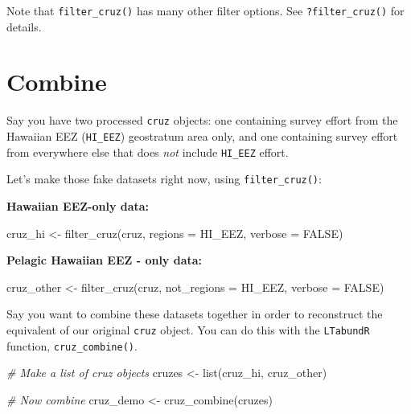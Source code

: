 \documentclass[
]{book}
\newenvironment{Shaded}{\begin{snugshade}}{\end{snugshade}}
\newcommand{\AttributeTok}[1]{\textcolor[rgb]{0.77,0.63,0.00}{#1}}
\newcommand{\CommentTok}[1]{\textcolor[rgb]{0.56,0.35,0.01}{\textit{#1}}}
\newcommand{\ConstantTok}[1]{\textcolor[rgb]{0.00,0.00,0.00}{#1}}
\newcommand{\FunctionTok}[1]{\textcolor[rgb]{0.00,0.00,0.00}{#1}}
\newcommand{\NormalTok}[1]{#1}
\newcommand{\OtherTok}[1]{\textcolor[rgb]{0.56,0.35,0.01}{#1}}
\newcommand{\StringTok}[1]{\textcolor[rgb]{0.31,0.60,0.02}{#1}}
\begin{document}
Note that \texttt{filter\_cruz()} has many other filter options. See \texttt{?filter\_cruz()} for details.

\hypertarget{combine}{%
\section*{Combine}\label{combine}}

Say you have two processed \texttt{cruz} objects: one containing survey effort from the Hawaiian EEZ (\texttt{HI\_EEZ}) geostratum area only, and one containing survey effort from everywhere else that does \emph{not} include \texttt{HI\_EEZ} effort.

Let's make those fake datasets right now, using \texttt{filter\_cruz()}:

\textbf{Hawaiian EEZ-only data:}

\begin{Shaded}
\begin{Highlighting}[]
\NormalTok{cruz\_hi }\OtherTok{\textless{}{-}} \FunctionTok{filter\_cruz}\NormalTok{(cruz, }
                            \AttributeTok{regions =} \StringTok{\textquotesingle{}HI\_EEZ\textquotesingle{}}\NormalTok{, }
                            \AttributeTok{verbose =} \ConstantTok{FALSE}\NormalTok{)}
\end{Highlighting}
\end{Shaded}

\textbf{Pelagic Hawaiian EEZ - only data:}

\begin{Shaded}
\begin{Highlighting}[]
\NormalTok{cruz\_other }\OtherTok{\textless{}{-}} \FunctionTok{filter\_cruz}\NormalTok{(cruz, }
                           \AttributeTok{not\_regions =} \StringTok{\textquotesingle{}HI\_EEZ\textquotesingle{}}\NormalTok{, }
                           \AttributeTok{verbose =} \ConstantTok{FALSE}\NormalTok{)}
\end{Highlighting}
\end{Shaded}

Say you want to combine these datasets together in order to reconstruct the equivalent of our original \texttt{cruz} object. You can do this with the \texttt{LTabundR} function, \texttt{cruz\_combine()}.

\begin{Shaded}
\begin{Highlighting}[]
\CommentTok{\# Make a list of cruz objects}
\NormalTok{cruzes }\OtherTok{\textless{}{-}} \FunctionTok{list}\NormalTok{(cruz\_hi, cruz\_other)}

\CommentTok{\# Now combine}
\NormalTok{cruz\_demo }\OtherTok{\textless{}{-}} \FunctionTok{cruz\_combine}\NormalTok{(cruzes)}
\end{Highlighting}
\end{Shaded}
\end{document}
